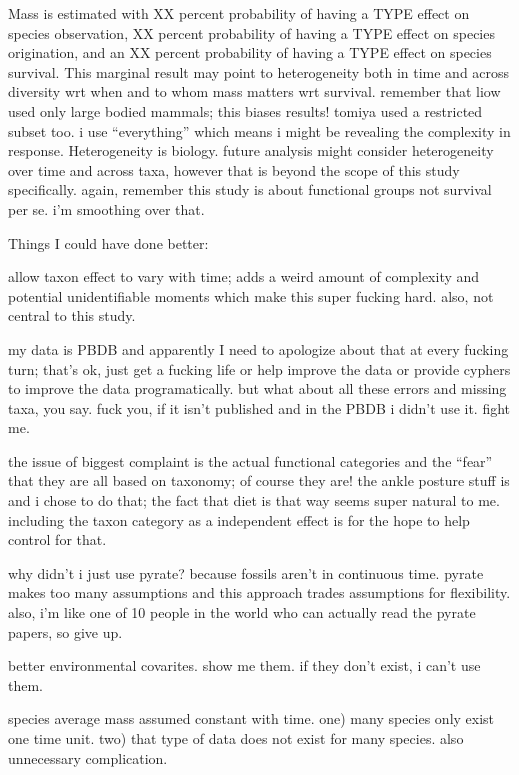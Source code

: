 \documentclass[12pt,letterpaper]{article}
\begin{document}
Mass is estimated with XX percent probability of having a TYPE effect on species observation, XX percent probability of having a TYPE effect on species origination, and an XX percent probability of having a TYPE effect on species survival. This marginal result may point to heterogeneity both in time and across diversity wrt when and to whom mass matters wrt survival. remember that liow used only large bodied mammals; this biases results! tomiya used a restricted subset too. i use ``everything'' which means i might be revealing the complexity in response. Heterogeneity is biology. future analysis might consider heterogeneity over time and across taxa, however that is beyond the scope of this study specifically. again, remember this study is about functional groups not survival per se. i'm smoothing over that.






Things I could have done better: 

allow taxon effect to vary with time; adds a weird amount of complexity and potential unidentifiable moments which make this super fucking hard. also, not central to this study. 

my data is PBDB and apparently I need to apologize about that at every fucking turn; that's ok, just get a fucking life or help improve the data or provide cyphers to improve the data programatically. but what about all these errors and missing taxa, you say. fuck you, if it isn't published and in the PBDB i didn't use it. fight me.

the issue of biggest complaint is the actual functional categories and the ``fear'' that they are all based on taxonomy; of course they are! the ankle posture stuff is and i chose to do that; the fact that diet is that way seems super natural to me. including the taxon category as a independent effect is for the hope to help control for that. 

why didn't i just use pyrate? because fossils aren't in continuous time. pyrate makes too many assumptions and this approach trades assumptions for flexibility. also, i'm like one of 10 people in the world who can actually read the pyrate papers, so give up.

better environmental covarites. show me them. if they don't exist, i can't use them.

species average mass assumed constant with time. one) many species only exist one time unit. two) that type of data does not exist for many species. also unnecessary complication.
\end{document}
